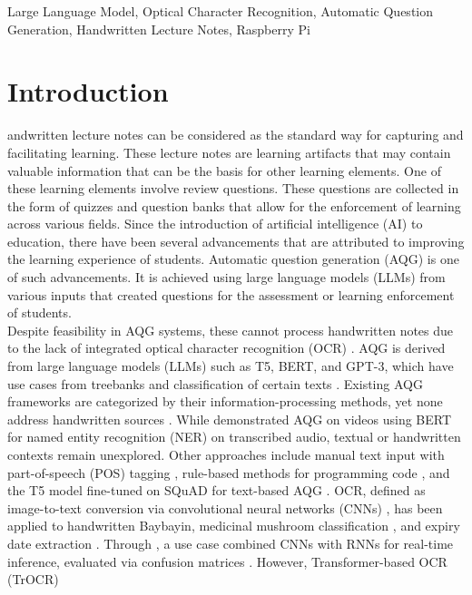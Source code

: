 \documentclass[conference]{IEEEtran}
\begin{document}
\begin{IEEEkeywords}
Large Language Model, Optical Character Recognition,
Automatic Question Generation, Handwritten Lecture Notes, Raspberry Pi
\end{IEEEkeywords}

\section{Introduction}
andwritten lecture notes can be considered as the standard way 
for capturing and facilitating learning. These lecture notes are 
learning artifacts that may contain valuable information that can 
be the basis for other learning elements. One of these learning elements 
involve review questions. These questions are collected in the 
form of quizzes and question banks that allow for the enforcement of 
learning across various fields. Since the introduction of artificial 
intelligence (AI) to education, there have been several advancements 
that are attributed to improving the learning experience of students. 
Automatic question generation (AQG) is one of such advancements. 
It is achieved using large language models (LLMs) from various inputs 
that created questions for the assessment or learning enforcement of 
students.
\\
\indent Despite feasibility in AQG systems, 
these cannot process handwritten notes 
due to the lack of integrated optical character recognition (OCR) 
\cite{Arbaaeen2020}. AQG is derived from large language models (LLMs) 
such as T5, BERT, and GPT-3, which have use cases from 
treebanks \cite{Mesina2020} and classification of certain texts \cite{Padilla2020}.
Existing AQG frameworks are categorized by 
their information-processing methods, yet none address 
handwritten sources \cite{Arbaaeen2020}. While \cite{Ou2022} demonstrated AQG 
on videos using BERT for named entity recognition (NER) on 
transcribed audio, textual or handwritten contexts remain 
unexplored. Other approaches include manual text input 
with part-of-speech (POS) tagging \cite{Moron2021}, rule-based methods 
for programming code \cite{Gaur2023}, and the T5 model 
fine-tuned on SQuAD for text-based AQG \cite{Tsai2021}. OCR, defined as 
image-to-text conversion via convolutional neural networks (CNNs) \cite{Ligsay2022}, has been applied to handwritten Baybayin, medicinal mushroom classification \cite{Sutayco2024}, and expiry date extraction \cite{Manlises2024}. Through \cite{Calimag2023}, a use case combined CNNs with RNNs for real-time inference, evaluated via confusion matrices \cite{Ishikawa2020} \cite{Villaverde2023}. However, Transformer-based OCR (TrOCR) 
\end{document}
